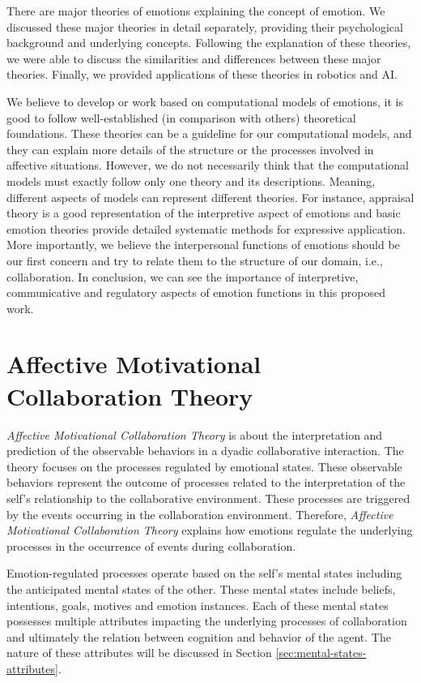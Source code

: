 \documentclass[12pt]{report}
\begin{document}
There are major theories of emotions explaining the concept of emotion. We
discussed these major theories in detail separately, providing their
psychological background and underlying concepts. Following the explanation of
these theories, we were able to discuss the similarities and differences between
these major theories. Finally, we provided applications of these theories in
robotics and AI.

We believe to develop or work based on computational models of emotions, it is
good to follow well-established (in comparison with others) theoretical
foundations. These theories can be a guideline for our computational models, and
they can explain more details of the structure or the processes involved in
affective situations. However, we do not necessarily think that the
computational models must exactly follow only one theory and its descriptions.
Meaning, different aspects of models can represent different theories. For
instance, appraisal theory is a good representation of the interpretive aspect
of emotions and basic emotion theories provide detailed systematic methods for
expressive application. More importantly, we believe the interpersonal functions
of emotions should be our first concern and try to relate them to the structure
of our domain, i.e., collaboration. In conclusion, we can see the importance of
interpretive, communicative and regulatory aspects of emotion functions in this
proposed work.

\chapter{Affective Motivational Collaboration Theory}
\label{ch:amct}
\textit{Affective Motivational Collaboration Theory} is about the interpretation
and prediction of the observable behaviors in a dyadic collaborative
interaction. The theory focuses on the processes regulated by emotional states.
These observable behaviors represent the outcome of processes related to the
interpretation of the self's relationship to the collaborative environment.
These processes are triggered by the events occurring in the collaboration
environment. Therefore, \textit{Affective Motivational Collaboration Theory}
explains how emotions regulate the underlying processes in the occurrence of
events during collaboration.

Emotion-regulated processes operate based on the self's mental states including
the anticipated mental states of the other. These mental states include beliefs,
intentions, goals, motives and emotion instances. Each of these mental states
possesses multiple attributes impacting the underlying processes of
collaboration and ultimately the relation between cognition and behavior of the
agent. The nature of these attributes will be discussed in Section
\ref{sec:mental-states-attributes}.
\end{document}
